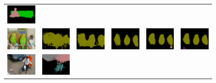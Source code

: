 \begin{figure}[!htbp]
{\begin{tabular}{c c c c c c}
    \includegraphics[height=0.11\linewidth]{fig/val_crf_vis/cocomix/2009_001299.png} \\
    \includegraphics[height=0.123\linewidth]{fig/val_crf_vis/img/2010_004994.jpg} &
    \includegraphics[height=0.123\linewidth]{fig/val_crf_vis/adaweak/2010_004994.png} &
    \includegraphics[height=0.123\linewidth]{fig/val_crf_vis/bbox/2010_004994.png} &
    \includegraphics[height=0.123\linewidth]{fig/val_crf_vis/bbox_crf/2010_004994.png} &
    \includegraphics[height=0.123\linewidth]{fig/val_crf_vis/strongweak/2010_004994.png} &
    \includegraphics[height=0.123\linewidth]{fig/val_crf_vis/cocomix/2010_004994.png} \\
    \includegraphics[height=0.122\linewidth]{fig/val_crf_vis/img/2011_002322.jpg} &
    \includegraphics[height=0.122\linewidth]{fig/val_crf_vis/adaweak/2011_002322.png} &

\end{tabular}}
\end{figure}
